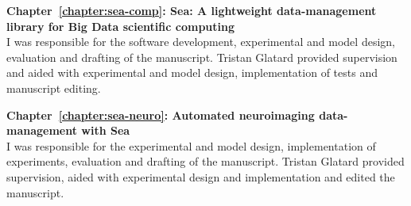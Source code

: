 \begin{contributions}
	\textbf{Chapter~\ref{chapter:sea-comp}: Sea: A lightweight data-management library for Big Data scientific
computing}\\
	I was responsible for the software development, experimental and model design, evaluation and drafting of the manuscript.
	Tristan Glatard provided supervision and aided with experimental and model design, implementation of tests and manuscript editing.


	\textbf{Chapter~\ref{chapter:sea-neuro}: Automated neuroimaging data-management with Sea}\\
	I was responsible for the experimental and model design, implementation of experiments, evaluation and drafting of the manuscript.
	Tristan Glatard provided supervision, aided with experimental design and implementation and edited the manuscript.






\end{contributions}